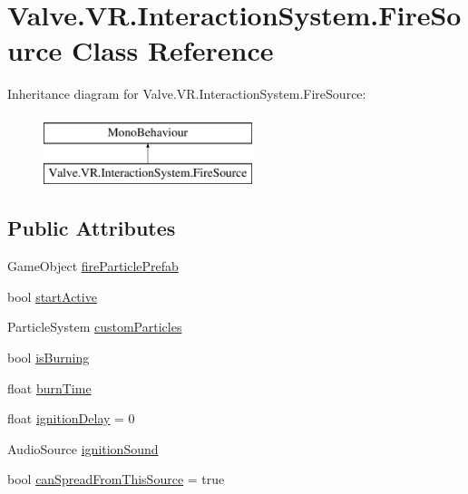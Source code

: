 \hypertarget{class_valve_1_1_v_r_1_1_interaction_system_1_1_fire_source}{}\section{Valve.\+V\+R.\+Interaction\+System.\+Fire\+Source Class Reference}
\label{class_valve_1_1_v_r_1_1_interaction_system_1_1_fire_source}
Inheritance diagram for Valve.\+V\+R.\+Interaction\+System.\+Fire\+Source\+:\begin{figure}[H]
\begin{center}
\leavevmode
\includegraphics[height=2.000000cm]{class_valve_1_1_v_r_1_1_interaction_system_1_1_fire_source}
\end{center}
\end{figure}
\subsection*{Public Attributes}
\begin{DoxyCompactItemize}
\item 
Game\+Object \mbox{\hyperlink{class_valve_1_1_v_r_1_1_interaction_system_1_1_fire_source_a43eda38fee33e6340e4f802935391608}{fire\+Particle\+Prefab}}
\item 
bool \mbox{\hyperlink{class_valve_1_1_v_r_1_1_interaction_system_1_1_fire_source_a6d745cf0cbeaf3781eb895dab6733a72}{start\+Active}}
\item 
Particle\+System \mbox{\hyperlink{class_valve_1_1_v_r_1_1_interaction_system_1_1_fire_source_a348b010a843852db3a7a5077af797181}{custom\+Particles}}
\item 
bool \mbox{\hyperlink{class_valve_1_1_v_r_1_1_interaction_system_1_1_fire_source_a533abd233b96d3f75164bc913e4e30b8}{is\+Burning}}
\item 
float \mbox{\hyperlink{class_valve_1_1_v_r_1_1_interaction_system_1_1_fire_source_a0cf138ded18ba643aee2b0ab09d3e9ac}{burn\+Time}}
\item 
float \mbox{\hyperlink{class_valve_1_1_v_r_1_1_interaction_system_1_1_fire_source_a52bbb7ef9526082b85fe65551b8de5d6}{ignition\+Delay}} = 0
\item 
Audio\+Source \mbox{\hyperlink{class_valve_1_1_v_r_1_1_interaction_system_1_1_fire_source_a04390c7d717b99df1c62e0bce8787b48}{ignition\+Sound}}
\item 
bool \mbox{\hyperlink{class_valve_1_1_v_r_1_1_interaction_system_1_1_fire_source_a8a7fc87cf9307f5cb2c45b717f0de9dc}{can\+Spread\+From\+This\+Source}} = true
\end{DoxyCompactItemize}


